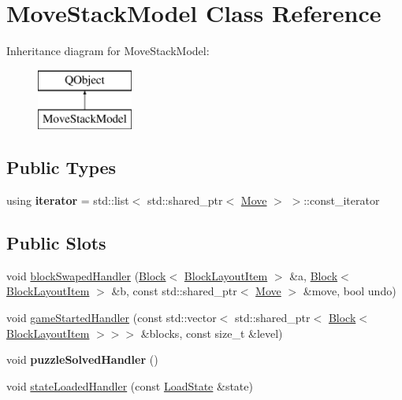 \hypertarget{class_move_stack_model}{}\section{Move\+Stack\+Model Class Reference}
\label{class_move_stack_model}
Inheritance diagram for Move\+Stack\+Model\+:\begin{figure}[H]
\begin{center}
\leavevmode
\includegraphics[height=2.000000cm]{class_move_stack_model}
\end{center}
\end{figure}
\subsection*{Public Types}
\begin{DoxyCompactItemize}
\item 
\mbox{\label{class_move_stack_model_a64b3cd5b744e18ce4cebd87957b2f3fa}} 
using {\bfseries iterator} = std\+::list$<$ std\+::shared\+\_\+ptr$<$ \mbox{\hyperlink{struct_move}{Move}} $>$ $>$\+::const\+\_\+iterator
\end{DoxyCompactItemize}
\subsection*{Public Slots}
\begin{DoxyCompactItemize}
\item 
void \mbox{\hyperlink{class_move_stack_model_a8ff4e26b9eaded33ae9a2588d470feaa}{block\+Swaped\+Handler}} (\mbox{\hyperlink{class_block}{Block}}$<$ \mbox{\hyperlink{class_block_layout_item}{Block\+Layout\+Item}} $>$ \&a, \mbox{\hyperlink{class_block}{Block}}$<$ \mbox{\hyperlink{class_block_layout_item}{Block\+Layout\+Item}} $>$ \&b, const std\+::shared\+\_\+ptr$<$ \mbox{\hyperlink{struct_move}{Move}} $>$ \&move, bool undo)
\item 
void \mbox{\hyperlink{class_move_stack_model_a8340fbe17638209c13250962fd4e2ff3}{game\+Started\+Handler}} (const std\+::vector$<$ std\+::shared\+\_\+ptr$<$ \mbox{\hyperlink{class_block}{Block}}$<$ \mbox{\hyperlink{class_block_layout_item}{Block\+Layout\+Item}} $>$$>$$>$ \&blocks, const size\+\_\+t \&level)
\item 
\mbox{\label{class_move_stack_model_a7fba5a7c9c8cca32112274c87b45fa82}} 
void {\bfseries puzzle\+Solved\+Handler} ()
\item 
void \mbox{\hyperlink{class_move_stack_model_a2c8028466c62b5f8b269b71939c56ef8}{state\+Loaded\+Handler}} (const \mbox{\hyperlink{struct_load_state}{Load\+State}} \&state)
\end{DoxyCompactItemize}
